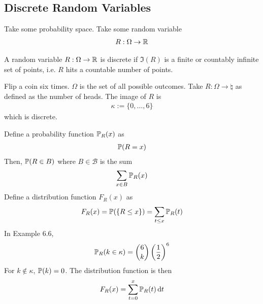 \subsection{Discrete Random Variables}
Take some probability space. Take some random variable
\begin{align}
    R: \Omega \to \mathbb{R}
\end{align}
\begin{definition}
    A random variable $R: \Omega \to \mathbb{R}$ is discrete if $\Im(R)$ is a finite or countably infinite set of points, i.e. $R$ hits a countable number of points.
\end{definition}
\begin{example}
    Flip a coin six times. $\Omega$ is the set of all possible outcomes. Take $R: \Omega \to \natural$ as defined as the number of heads. The image of $R$ is
    \begin{align}
        \kappa := \{ 0, \ldots, 6 \}
    \end{align}
    which is discrete.
\end{example}
\noindent Define a probability function $\mathbb{P}_R(x)$ as
\begin{align}
    \mathbb{P}(R = x)
\end{align}
Then, $\mathbb{P}(R \in B)$ where $B \in \mathcal{B}$ is the sum
\begin{align}
    \sum_{x \in B} \mathbb{P}_R(x)
\end{align}
Define a distribution function $F_R(x)$ as
\begin{align}
    F_R(x) = \mathbb{P}(\{ R \le x \}) = \sum_{t \le x} \mathbb{P}_R(t)
\end{align}
In Example 6.6,
\begin{align}
    \mathbb{P}_R(k \in \kappa) = \binom{6}{k}\left( \frac{1}{2} \right)^6
\end{align}
For $k \notin \kappa$, $\mathbb{P}(k) = 0$. The distribution function is then
\begin{align}
    F_R(x) = \sum_{t=0}^x \mathbb{P}_R(t) \dd{t}
\end{align}


